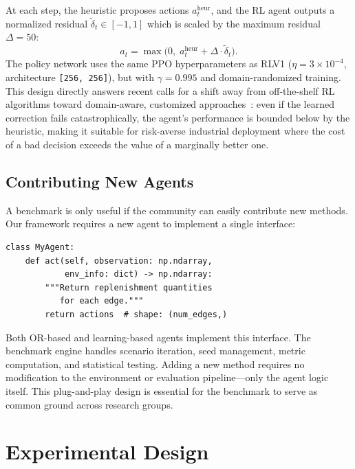\documentclass[preprint,12pt]{elsarticle}
\begin{document}
At each step, the heuristic proposes actions $a_t^{\text{heur}}$, and the
RL agent outputs a normalized residual $\tilde{\delta}_t \in [-1, 1]$
which is scaled by the maximum residual $\Delta = 50$:
\begin{equation}\label{eq:residual}
  a_t = \max\bigl(0,\; a_t^{\text{heur}} + \Delta \cdot \tilde{\delta}_t\bigr).
\end{equation}
The policy network uses the same PPO hyperparameters as RLV1
($\eta = 3 \times 10^{-4}$, architecture \texttt{[256,~256]}),
but with $\gamma = 0.995$ and domain-randomized training.
This design directly answers recent calls for a shift away from
off-the-shelf RL algorithms toward domain-aware, customized
approaches~\citep{gholami2024systematic}: even if the learned correction
fails catastrophically, the agent's performance is bounded below by the
heuristic, making it suitable for risk-averse industrial deployment
where the cost of a bad decision exceeds the value of a marginally
better one.

\subsection{Contributing New Agents}\label{sec:contributing}

A benchmark is only useful if the community can easily contribute new
methods. Our framework requires a new agent to implement a single
interface:

\begin{verbatim}
class MyAgent:
    def act(self, observation: np.ndarray,
            env_info: dict) -> np.ndarray:
        """Return replenishment quantities
           for each edge."""
        return actions  # shape: (num_edges,)
\end{verbatim}

Both OR-based and learning-based agents implement this interface.
The benchmark engine handles scenario iteration, seed management,
metric computation, and statistical testing. Adding a new method
requires no modification to the environment or evaluation pipeline---only
the agent logic itself. This plug-and-play design is essential for the
benchmark to serve as common ground across research groups.


\section{Experimental Design}\label{sec:design}
\end{document}
